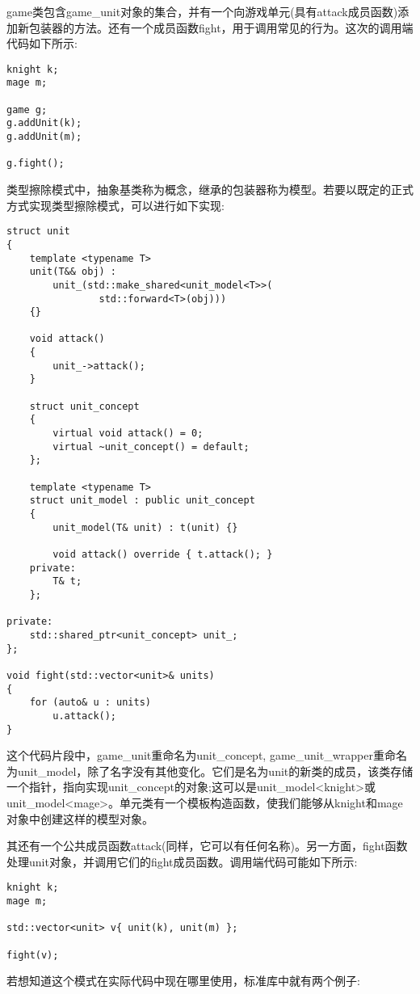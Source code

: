 game类包含game\_unit对象的集合，并有一个向游戏单元(具有attack成员函数)添加新包装器的方法。还有一个成员函数fight，用于调用常见的行为。这次的调用端代码如下所示:

\begin{lstlisting}[style=styleCXX]
knight k;
mage m;

game g;
g.addUnit(k);
g.addUnit(m);

g.fight();
\end{lstlisting}

类型擦除模式中，抽象基类称为概念，继承的包装器称为模型。若要以既定的正式方式实现类型擦除模式，可以进行如下实现:

\begin{lstlisting}[style=styleCXX]
struct unit
{
	template <typename T>
	unit(T&& obj) :
		unit_(std::make_shared<unit_model<T>>(
				std::forward<T>(obj)))
	{}
	
	void attack()
	{
		unit_->attack();
	}

	struct unit_concept
	{
		virtual void attack() = 0;
		virtual ~unit_concept() = default;
	};

	template <typename T>
	struct unit_model : public unit_concept
	{
		unit_model(T& unit) : t(unit) {}
		
		void attack() override { t.attack(); }
	private:
		T& t;
	};

private:
	std::shared_ptr<unit_concept> unit_;
};

void fight(std::vector<unit>& units)
{
	for (auto& u : units)
		u.attack();
}
\end{lstlisting}

这个代码片段中，game\_unit重命名为unit\_concept, game\_unit\_wrapper重命名为unit\_model，除了名字没有其他变化。它们是名为unit的新类的成员，该类存储一个指针，指向实现unit\_concept的对象;这可以是unit\_model<knight>或unit\_model<mage>。单元类有一个模板构造函数，使我们能够从knight和mage对象中创建这样的模型对象。

其还有一个公共成员函数attack(同样，它可以有任何名称)。另一方面，fight函数处理unit对象，并调用它们的fight成员函数。调用端代码可能如下所示:

\begin{lstlisting}[style=styleCXX]
knight k;
mage m;

std::vector<unit> v{ unit(k), unit(m) };

fight(v);
\end{lstlisting}

若想知道这个模式在实际代码中现在哪里使用，标准库中就有两个例子:

